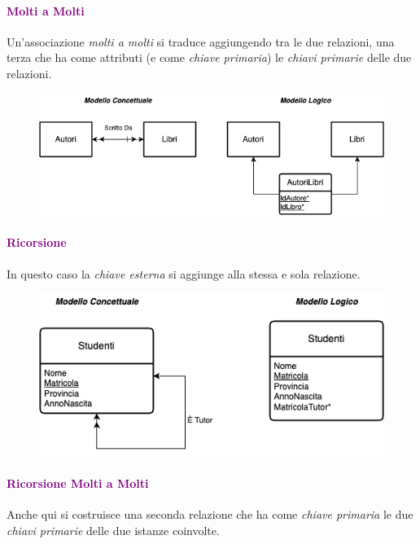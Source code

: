 \paragraph{\textcolor{purple}{Molti a Molti}}
Un'associazione \emph{molti a molti} si traduce aggiungendo tra
le due relazioni, una terza che ha come attributi (e come \emph{chiave primaria})
le \emph{chiavi primarie} delle due relazioni.

\begin{figure}[H]
    \centering
    \includegraphics[scale=0.55]{img/moltimolti.png}
\end{figure}

\paragraph{\textcolor{purple}{Ricorsione}}
In questo caso la \emph{chiave esterna} si aggiunge alla stessa e sola
relazione.

\begin{figure}[H]
    \centering
    \includegraphics[scale=0.55]{img/ricorsioneunomolti.png}
\end{figure}

\paragraph{\textcolor{purple}{Ricorsione Molti a Molti}}
Anche qui si costruisce una seconda relazione che ha come \emph{chiave primaria}
le due \emph{chiavi primarie} delle due istanze coinvolte.

